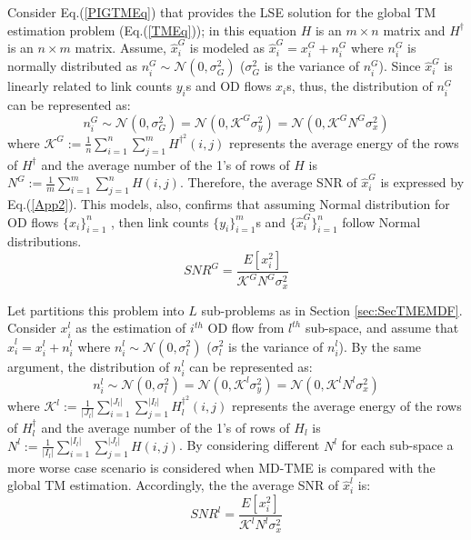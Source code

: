 Consider Eq.(\ref{PIGTMEq}) that provides the LSE solution for the global TM estimation problem (Eq.(\ref{TMEq})); in this equation $H$ is an $m\times n$ matrix and $H^{\dagger}$ is an $n\times m$ matrix. Assume, $\hat{x}^{G}_{i}$ is modeled as $\hat{x}^{G}_{i}=x^{G}_{i}+n^{G}_{i}$ where $n^{G}_{i}$ is normally distributed as $n^{G}_{i} \sim \mathcal{N}(0,\sigma^{2}_{G})$  ($\sigma^{2}_{G}$ is the variance of $n^{G}_{i}$). Since $\hat{x}^{G}_{i}$ is linearly related to link counts $y_{i}$s and OD flows $x_{i}$s, thus, the distribution of $n^{G}_{i}$ can be represented as:
\begin{equation}\label{App1}
n^{G}_{i}\sim \mathcal{N}(0,\sigma^{2}_{G})=\mathcal{N}(0,\mathcal{K}^{G}\sigma^{2}_{y})=\mathcal{N}(0,\mathcal{K}^{G}N^{G}\sigma^{2}_{x})
\end{equation}
where $\mathcal{K}^{G}:=\frac{1}{n}\sum_{i=1}^{n}\sum_{j=1}^{m} H^{\dagger^{2}}(i,j)$ represents the average energy of the rows of $H^{\dagger}$ and the average number of the 1's of rows of $H$ is $N^{G}:=\frac{1}{m}\sum_{i=1}^{m}\sum_{j=1}^{n} H(i,j)$. Therefore, the average SNR of $\hat{x}^{G}_{i}$ is expressed by Eq.(\ref{App2}). This models, also, confirms that assuming Normal distribution for OD flows $\{x_{i}\}_{i=1}^{n}$ \cite{Medina,Cao}, then link counts $\{y_{i}\}_{i=1}^{m}$s and $\{\hat{x}^{G}_{i}\}_{i=1}^{n}$ follow Normal distributions.
\begin{equation}\label{App2}
SNR^{G} = \frac{E[x^{2}_{i}]}{\mathcal{K}^{G}N^{G}\sigma^{2}_{x}}
\end{equation}

Let partitions this problem into $L$ sub-problems as in Section \ref{sec:SecTMEMDF}. Consider $x^{l}_{i}$ as the estimation of $i^{th}$ OD flow from $l^{th}$ sub-space, and assume that $\hat{x}^{l}_{i} = x^{l}_{i}+n^{l}_{i}$ where $n^{l}_{i} \sim \mathcal{N}(0,\sigma^{2}_{l})$ ($\sigma^{2}_{l}$ is the variance of $n^{l}_{i}$). By the same argument, the distribution of $n^{l}_{i}$ can be represented as:
\begin{equation}\label{App3}
n^{l}_{i}\sim \mathcal{N}(0,\sigma^{2}_{l})=\mathcal{N}(0,\mathcal{K}^{l}\sigma^{2}_{y})=\mathcal{N}(0,\mathcal{K}^{l}N^{l}\sigma^{2}_{x})
\end{equation}
where $\mathcal{K}^{l}:=\frac{1}{|J_{l}|}\sum_{i=1}^{|J_{l}|}\sum_{j=1}^{|I_{l}|} H^{\dagger^{2}}_{l}(i,j)$ represents the average energy of the rows of $H^{\dagger}_{l}$ and the average number of the 1's of rows of $H_{l}$ is $N^{l}:=\frac{1}{|I_{l}|}\sum_{i=1}^{|I_{l}|}\sum_{j=1}^{|J_{l}|} H(i,j)$. By considering different $N^{l}$ for each sub-space a more worse case scenario is considered when MD-TME is compared with the global TM estimation. Accordingly, the the average SNR of $\hat{x}^{l}_{i}$ is:
\begin{equation}\label{App4}
SNR^{l} = \frac{E[x^{2}_{i}]}{\mathcal{K}^{l}N^{l}\sigma^{2}_{x}}
\end{equation}

